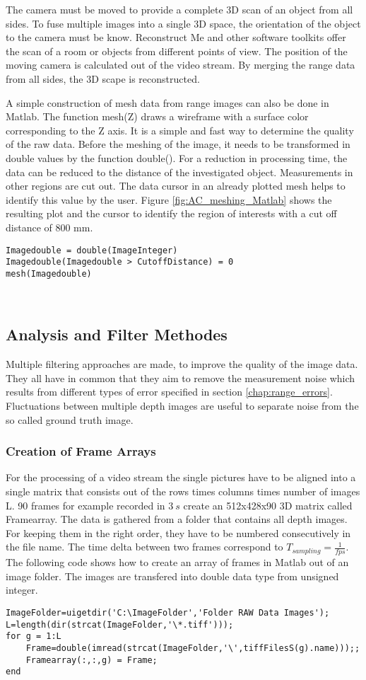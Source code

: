 The camera must be moved to provide a complete 3D scan of an object from all sides. To fuse multiple images into a single 3D space, the orientation of the object to the camera must be know. Reconstruct Me and other software toolkits offer the scan of a room or objects from different points of view. The position of the moving camera is calculated out of the video stream. By merging the range data from all sides, the 3D scape is reconstructed. 

A simple construction of mesh data from range images can also be done in Matlab. The function mesh(Z) draws a wireframe with a surface color corresponding to the Z axis. It is a simple and fast way to determine the quality of the raw data. Before the meshing of the image, it needs to be transformed in double values by the function double(). For a reduction in processing time, the data can be reduced to the distance of the investigated object. Measurements in other regions are cut out. The data cursor in an already plotted mesh helps to identify this value by the user. Figure \ref{fig:AC_meshing_Matlab} shows the resulting plot and the cursor to identify the region of interests with a cut off distance of 800 mm.
\medskip
\begin{lstlisting}
Imagedouble = double(ImageInteger)
Imagedouble(Imagedouble > CutoffDistance) = 0
mesh(Imagedouble)
\end{lstlisting}

\
\subsection{Analysis and Filter Methodes} 
 Multiple filtering approaches are made, to improve the quality of the image data. They all have in common that they aim to remove the measurement noise which results from different types of error specified in section \ref{chap:range_errors}. Fluctuations between multiple depth images are useful to separate noise from the so called ground truth image. 

\subsubsection{Creation of Frame Arrays} \label{chap:Framearray}
For the processing of a video stream the single pictures have to be aligned into a single matrix that consists out of the rows times columns times number of images L. 90 frames for example recorded in $3~s$ create an 512x428x90 3D matrix called Framearray. The data is gathered from a folder that contains all depth images. For keeping them in the right order, they have to be numbered consecutively in the file name. The time delta between two frames correspond to $T_{sampling} =\frac{1}{fps}$. The following code shows how to create an array of frames in Matlab out of an image folder. The images are transfered into double data type from unsigned integer.
\medskip
\begin{lstlisting} 
ImageFolder=uigetdir('C:\ImageFolder','Folder RAW Data Images');
L=length(dir(strcat(ImageFolder,'\*.tiff')));
for g = 1:L
	Frame=double(imread(strcat(ImageFolder,'\',tiffFilesS(g).name)));;
	Framearray(:,:,g) = Frame;
end
\end{lstlisting} 

